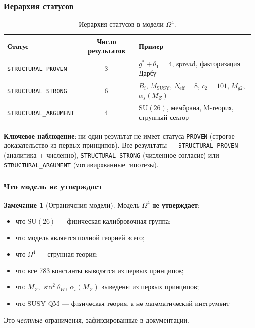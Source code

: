 \documentclass[11pt,a4paper]{article}
\newcommand{\SU}{\ensuremath{\mathrm{SU}}}
\newcommand{\Om}{\ensuremath{\Omega^4}}
\theoremstyle{definition}
\newtheorem{remark}[theorem]{Замечание}
\begin{document}
\subsubsection{Иерархия статусов}

\begin{table}[ht]
\centering
\caption{Иерархия статусов в модели \texorpdfstring{$\Om$}{}.}
\label{tab:conclusions-status-levels}
\begin{tabular}{lcp{5cm}}
\toprule
Статус & Число результатов & Пример \\
\midrule
\texttt{STRUCTURAL\_PROVEN} & 3 &
    $g^* + \theta_1 = 4$, spread, факторизация Дарбу \\[0.3em]
\texttt{STRUCTURAL\_STRONG} & 6 &
    $B_i$, $M_{\text{SUSY}}$, $N_{\text{eff}} = 8$, $c_2 = 101$,
    $M_{g2}$, $\alpha_s(M_Z)$ \\[0.3em]
\texttt{STRUCTURAL\_ARGUMENT} & 4 &
    $\SU(26)$, мембрана, M-теория, струнный сектор \\
\bottomrule
\end{tabular}
\end{table}

\medskip\noindent
\textbf{Ключевое наблюдение}: ни один результат не имеет
статуса \texttt{PROVEN} (строгое доказательство из первых
принципов). Все результаты --- \texttt{STRUCTURAL\_PROVEN}
(аналитика + численно), \texttt{STRUCTURAL\_STRONG}
(численное согласие) или \texttt{STRUCTURAL\_ARGUMENT}
(мотивированные гипотезы).

\subsubsection{Что модель \emph{не} утверждает}

\begin{remark}[Ограничения модели]
\label{rem:conclusions-limitations}
Модель $\Om$ \textbf{не утверждает}:
\begin{itemize}
    \item что $\SU(26)$ --- физическая калибровочная группа;
    \item что модель является полной теорией всего;
    \item что $\Om$ --- струнная теория;
    \item что все 783 константы выводятся из первых принципов;
    \item что $M_Z$, $\sin^2\theta_W$, $\alpha_s(M_Z)$
          выведены из первых принципов;
    \item что SUSY QM --- физическая теория, а не
          математический инструмент.
\end{itemize}
Это \emph{честные} ограничения, зафиксированные в
документации.
\end{remark}
\end{document}
